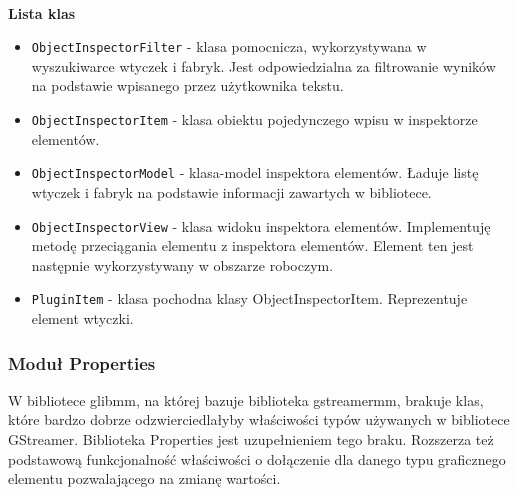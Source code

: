 \documentclass[12pt]{article}
\begin{document}
\paragraph{}
\textbf{Lista klas}
\vspace{-2mm}
\begin{itemize}
  \setlength{\itemsep}{0em}
\item \texttt{ObjectInspectorFilter} - klasa pomocnicza, wykorzystywana w wyszukiwarce wtyczek i fabryk. Jest odpowiedzialna za filtrowanie wyników na podstawie wpisanego przez użytkownika tekstu.
\item \texttt{ObjectInspectorItem} - klasa obiektu pojedynczego wpisu w inspektorze elementów. 
\item \texttt{ObjectInspectorModel} - klasa-model inspektora elementów. Ładuje listę wtyczek i fabryk na podstawie informacji zawartych w bibliotece.
\item \texttt{ObjectInspectorView} - klasa widoku inspektora elementów. Implementuję metodę przeciągania elementu z inspektora elementów. Element ten jest następnie wykorzystywany w obszarze roboczym.
\item \texttt{PluginItem} - klasa pochodna klasy ObjectInspectorItem. Reprezentuje element wtyczki.
\end{itemize}  
\subsubsection{Moduł Properties}
W bibliotece glibmm, na której bazuje biblioteka gstreamermm, brakuje klas, które bardzo dobrze odzwierciedlałyby właściwości typów używanych w bibliotece GStreamer. Biblioteka Properties jest uzupełnieniem tego braku. Rozszerza też podstawową funkcjonalność właściwości o dołączenie dla  danego typu graficznego elementu pozwalającego na zmianę wartości. 
\end{document}
